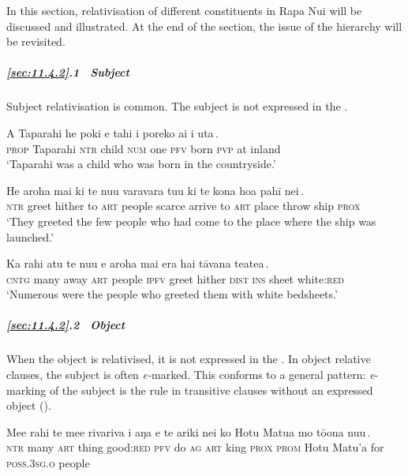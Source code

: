 In this section, relativisation of different constituents in Rapa Nui will be discussed and illustrated. At the end of the section, the issue of the  hierarchy will be revisited.

\subparagraph{\ref{sec:11.4.2}.1~ Subject} Subject relativisation is common. The subject is not expressed in the .

\ea\label{ex:11.88}
\gll A Taparahi he poki e tahi {\ob}i poreko ai {\ꞌ}i {\ꞌ}uta\,{\cb}. \\
\textsc{prop} Taparahi \textsc{ntr} child \textsc{num} one {\db}\textsc{pfv} born \textsc{pvp} at inland \\

\glt 
‘Taparahi was a child who was born in the countryside.’ \textstyleExampleref{[R250.001]} 
\z

\ea\label{ex:11.89}
\gll He {\ꞌ}aroha mai ki te nu{\ꞌ}u varavara {\ob}tu{\ꞌ}u ki te kona hoa pahī nei\,{\cb}. \\
\textsc{ntr} greet hither to \textsc{art} people scarce {\db}arrive to \textsc{art} place throw ship \textsc{prox} \\

\glt 
‘They greeted the few people who had come to the place where the ship was launched.’ \textstyleExampleref{[R250.235]} 
\z

\ea\label{ex:11.90}
\gll Ka rahi atu te nu{\ꞌ}u {\ob}e {\ꞌ}aroha mai era hai tāvana teatea\,{\cb}. \\
\textsc{cntg} many away \textsc{art} people {\db}\textsc{ipfv} greet hither \textsc{dist} \textsc{ins} sheet white:\textsc{red} \\

\glt 
‘Numerous were the people who greeted them with white bedsheets.’ \textstyleExampleref{[R210.087]} 
\z

\subparagraph{\ref{sec:11.4.2}.2~ Object} When the object is relativised, it is not expressed in the . In object relative clauses, the subject is often \textit{e}\textit{{}-}marked. This conforms to a general pattern: \textit{e}{}-marking of the subject is the rule in transitive clauses without an expressed object ().

\ea\label{ex:11.91}
\gll Me{\ꞌ}e rahi te me{\ꞌ}e rivariva {\ob}i aŋa e te {\ꞌ}ariki nei ko Hotu Matu{\ꞌ}a  mo tō{\ꞌ}ona nu{\ꞌ}u\,{\cb}.\\
\textsc{ntr} many \textsc{art} thing good:\textsc{red} {\db}\textsc{pfv} do \textsc{ag} \textsc{art} king \textsc{prox} \textsc{prom} Hotu Matu’a  for \textsc{poss.3sg.o} people\\

